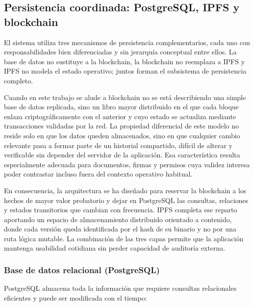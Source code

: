 \documentclass[11pt, a4paper]{article}
\begin{document}
\subsection{Persistencia coordinada: PostgreSQL, IPFS y blockchain}

El sistema utiliza tres mecanismos de persistencia complementarios, cada uno con responsabilidades bien diferenciadas y sin jerarquía conceptual entre ellos. La base de datos no sustituye a la blockchain, la blockchain no reemplaza a IPFS y IPFS no modela el estado operativo; juntos forman el subsistema de persistencia completo.

Cuando en este trabajo se alude a blockchain no se está describiendo una simple base de datos replicada, sino un libro mayor distribuido en el que cada bloque enlaza criptográficamente con el anterior y cuyo estado se actualiza mediante transacciones validadas por la red. La propiedad diferencial de este modelo no reside solo en que los datos queden almacenados, sino en que cualquier cambio relevante pasa a formar parte de un historial compartido, difícil de alterar y verificable sin depender del servidor de la aplicación. Esa característica resulta especialmente adecuada para documentos, firmas y permisos cuya validez interesa poder contrastar incluso fuera del contexto operativo habitual.

En consecuencia, la arquitectura se ha diseñado para reservar la blockchain a los hechos de mayor valor probatorio y dejar en PostgreSQL las consultas, relaciones y estados transitorios que cambian con frecuencia. IPFS completa ese reparto aportando un espacio de almacenamiento distribuido orientado a contenido, donde cada versión queda identificada por el hash de su binario y no por una ruta lógica mutable. La combinación de las tres capas permite que la aplicación mantenga usabilidad cotidiana sin perder capacidad de auditoría externa.

\subsubsection{Base de datos relacional (PostgreSQL)}

PostgreSQL almacena toda la información que requiere consultas relacionales eficientes y puede ser modificada con el tiempo:
\end{document}
